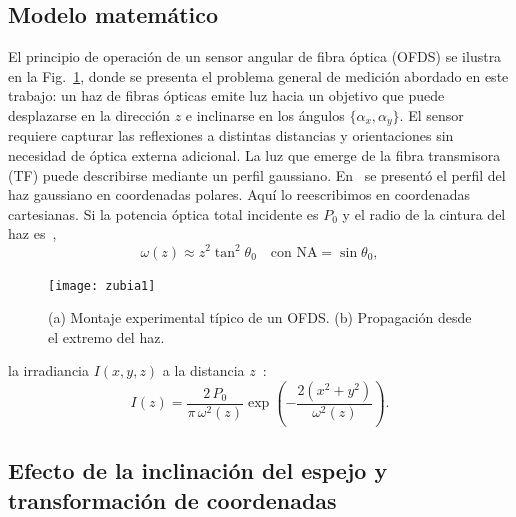 \documentclass[11pt,a4paper]{article}
\begin{document}
\begin{multicols}{2}
\section{Modelo matemático}
\label{sec:5_01}
\noindent El principio de operación de un sensor angular de fibra óptica (OFDS) se ilustra en la Fig.~\ref{fig:2_01}, donde se presenta el problema general de medición abordado en este trabajo: un haz de fibras ópticas emite luz hacia un objetivo que puede desplazarse en la dirección $z$ e inclinarse en los ángulos $\{\alpha_x,\alpha_y\}$. El sensor requiere capturar las reflexiones a distintas distancias y orientaciones sin necesidad de óptica externa adicional. La luz que emerge de la fibra transmisora (TF) puede describirse mediante un perfil gaussiano. En~\cite{zubia-depth_2024} se presentó el perfil del haz gaussiano en coordenadas polares. Aquí lo reescribimos en coordenadas cartesianas. Si la potencia óptica total incidente es $P_0$ y el radio de la cintura del haz es~\cite{zubia_new_2024},
\begin{equation}
    \omega(z)\approx z^2\tan^2\theta_0\quad \text{con } \mathrm{NA} = \sin\theta_0,
\end{equation}
\begin{figure}[H]
    \centering
    \texttt{[image: zubia1]}
    \caption{(a) Montaje experimental típico de un OFDS. (b) Propagación desde el extremo del haz.}
    \label{fig:2_01}
\end{figure}
la irradiancia $I(x,y,z)$ a la distancia $z$~\cite{zubia_-depth_2024,zubia_theoretical_2024}:
\begin{equation}
    I(z)= \frac{2\,P_0}{\pi\,\omega^2(z)}\exp\!\left(-\frac{2(x^2 + y^2)}{\omega^2(z)}\right).
    \label{eq:equ1}
\end{equation}

\subsection{Efecto de la inclinación del espejo y transformación de coordenadas}
\label{sec:5_01_03}


\end{multicols}
\end{document}
